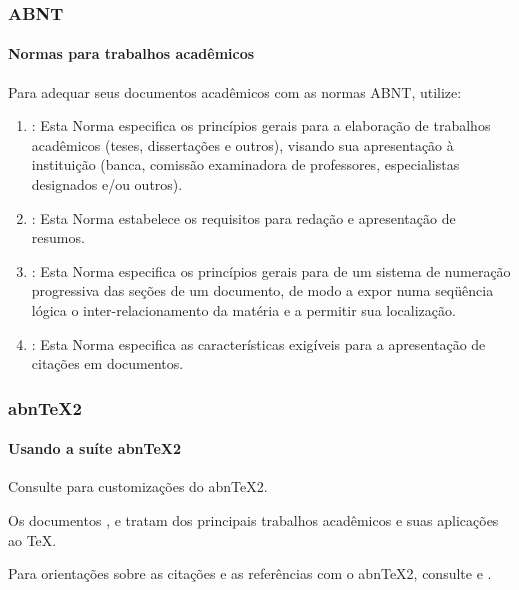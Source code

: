 \documentclass[aspectratio=169]{beamer}
\begin{document}
\begin{frame}
\frametitle{ABNT}
\framesubtitle{Normas para trabalhos acadêmicos}

Para adequar seus documentos acadêmicos com as normas ABNT, utilize:
\begin{enumerate}
 \item {}: Esta Norma especifica os princípios gerais
 para a elaboração de trabalhos acadêmicos (teses, dissertações e outros),
 visando sua apresentação à instituição (banca, comissão examinadora de
 professores, especialistas designados e/ou outros).
 
 \item {}: Esta Norma estabelece os requisitos para
 redação e apresentação de resumos.
 
 \item {}: Esta Norma especifica os princípios gerais
 para de um sistema de numeração progressiva das seções de um documento, de
 modo a expor numa seqüência lógica o inter-relacionamento da matéria e a
 permitir sua localização.
 
 \item {}: Esta Norma especifica as características
 exigíveis para a apresentação de citações em documentos.
\end{enumerate}

\end{frame}

\begin{frame}
\frametitle{abnTeX2}
\framesubtitle{Usando a suíte abnTeX2}

Consulte  para customizações do abnTeX2.
\vspace{0.5cm}

Os documentos ,
 e  tratam dos
principais trabalhos acadêmicos e suas aplicações ao TeX.
\vspace{0.5cm}

Para orientações sobre as citações e as referências com o abnTeX2, consulte
 e .
\vspace{0.5cm}

\end{frame}

\end{document}
